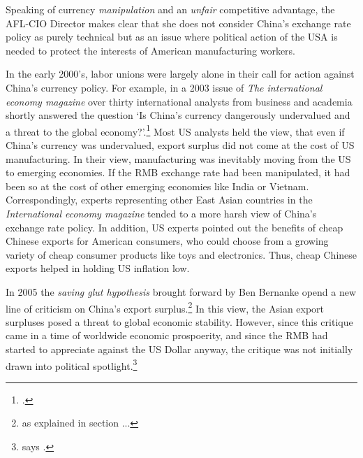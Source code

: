 Speaking of currency \emph{manipulation} and an \emph{unfair} competitive advantage, the AFL-CIO Director makes clear that she does not consider China's exchange rate policy as purely technical but as an issue where political action of the USA is needed to protect the interests of American manufacturing workers.

In the early 2000's, labor unions were largely alone in their call for action against China's currency policy. For example, in a 2003 issue of \emph{The international economy magazine} over thirty international analysts from business and academia shortly answered the question `Is China's currency dangerously undervalued and a threat to the global economy?'.\footnote{\cite{IEM2003}.}
Most US analysts held the view, that even if China's currency was undervalued, export surplus did not come at the cost of US manufacturing. In their view, manufacturing was inevitably moving from the US to emerging economies. If the RMB exchange rate had been manipulated, it had been so at the cost of other emerging economies like India or Vietnam. Correspondingly, experts representing other East Asian countries in the \emph{International economy magazine} tended to a more harsh view of China's exchange rate policy. In addition, US experts pointed out the benefits of cheap Chinese exports for American consumers, who could choose from a growing variety of cheap consumer products like toys and electronics. Thus, cheap Chinese exports helped in holding US inflation low.

In 2005 the \emph{saving glut hypothesis} brought forward by Ben Bernanke opend a new line of criticism on China's export surplus.\footnote{as explained in section ...} %
In this view, the Asian export surpluses posed a threat to global economic stability. However, since this critique came in a time of worldwide economic prospoerity, and since the RMB had started to appreciate against the US Dollar anyway, the critique was not initially drawn into political spotlight.\footnote{says \cite[p.16]{Levy2010}.}

